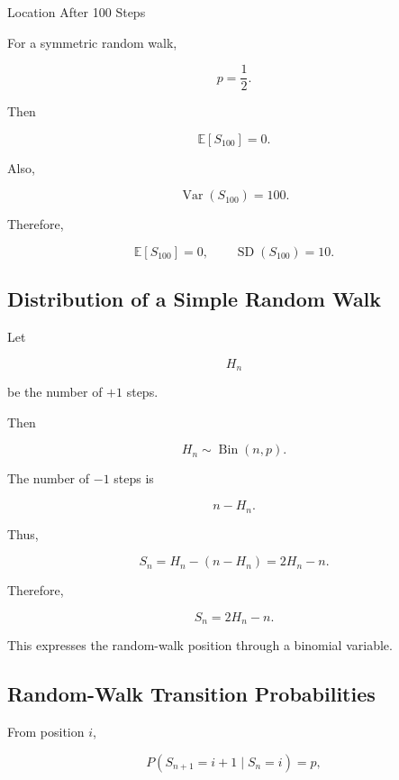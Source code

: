 \begin{workedexamplebox}{Location After 100 Steps}

For a symmetric random walk,

\[
p=\frac12.
\]

Then

\[
\mathbb{E}[S_{100}]=0.
\]

Also,

\[
\operatorname{Var}(S_{100})
=
100.
\]

Therefore,

\begin{answerbox}
\[
\boxed{
\mathbb{E}[S_{100}]=0,
\qquad
\operatorname{SD}(S_{100})=10.
}
\]
\end{answerbox}

\end{workedexamplebox}

\subsection{Distribution of a Simple Random Walk}
\label{subsec:simple-random-walk-distribution}

Let

\[
H_n
\]

be the number of \(+1\) steps.

Then

\[
H_n\sim\operatorname{Bin}(n,p).
\]

The number of \(-1\) steps is

\[
n-H_n.
\]

Thus,

\[
S_n
=
H_n-(n-H_n)
=
2H_n-n.
\]

Therefore,

\[
\boxed{
S_n=2H_n-n.
}
\]

This expresses the random-walk position through a binomial variable.

\subsection{Random-Walk Transition Probabilities}
\label{subsec:random-walk-transition-probabilities}

From position \(i\),

\[
P(S_{n+1}=i+1\mid S_n=i)
=
p,
\]

